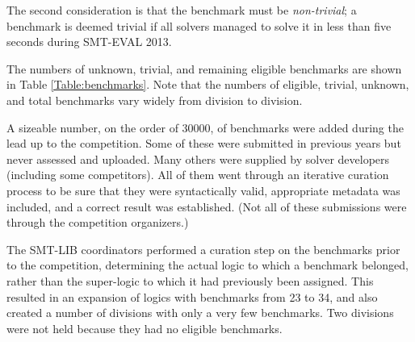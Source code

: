 \documentclass[twoside,11pt]{article}
\begin{document}
The second consideration is that the benchmark must be \emph{non-trivial}; a benchmark is deemed trivial if all solvers managed to solve it in less than five seconds during SMT-EVAL 2013.

The numbers of unknown, trivial, and remaining eligible benchmarks are shown in Table \ref{Table:benchmarks}. Note that the numbers of eligible, trivial, unknown, and total benchmarks vary widely from division to division.

A sizeable number, on the order of 30000, of benchmarks were added during the lead up to the competition. Some of these were submitted in previous years but never assessed and uploaded. Many others were supplied by solver developers (including some competitors). All of them went through an iterative curation process to be sure that they were syntactically valid, appropriate metadata was included, and a correct result was established. (Not all of these submissions were through the competition organizers.)

The SMT-LIB coordinators performed a curation step on the benchmarks prior to the competition, determining the actual logic to which a benchmark belonged, rather than the super-logic to which it had previously been assigned. This resulted in an expansion of logics with benchmarks from 23 to 34, and also created a number of divisions with only a very few benchmarks. Two divisions were not held because they had no eligible benchmarks.
\end{document}
